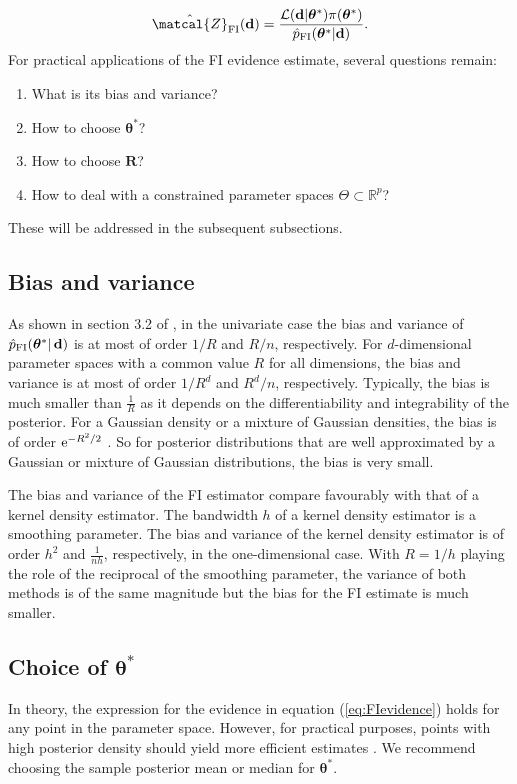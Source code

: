 \documentclass[%
 reprint,
 amsmath,amssymb,
 aps,
]{revtex4-2}
\def\R{\mathbb{R}}
\def\btheta{\boldsymbol{\theta}}
\def\btheta{\boldsymbol{\theta}}
\def\Rbold{\mathbf{R}}
\renewcommand{\d}{{\bf d}}
\newcommand{\btheta}{\mbox{\boldmath $\theta$}}
\newcommand{\e}{{\rm e}}
\begin{document}
\begin{equation}\label{eq:FIevidence}
 \hat{\matcal{Z}}_\text{FI}(\d) = \frac{\mathcal{L}(\d|\btheta^*)
 \pi(\btheta^*)}{\hat{p}_\text{FI}(\btheta^*|\d)}.
 \end{equation}
For practical applications of the FI evidence estimate, several questions remain:
\begin{enumerate}
     \item What is its bias and variance?
    \item How to choose $\btheta^*$?
    \item How to choose $\Rbold$?
    \item How to deal with a constrained parameter spaces $\Theta \subset \R^p$?
\end{enumerate}
These will be addressed in the subsequent subsections.


\subsection{\label{subsec:FI bias and variance} Bias and variance}
%
As shown in section 3.2 of \cite{rotiroti2022computing}, in the univariate case the bias and variance of $\hat{p}_\text{FI}(\btheta^*|\,\d)$ is at most of order $1/R$ and  $R/n$, respectively. For $d$-dimensional parameter spaces with a common value $R$ for all dimensions, the bias and variance is at most of order $1/R^d$ and  $R^d/n$, respectively. Typically, the bias is much smaller than $\frac{1}{R}$ as it depends on the differentiability and integrability of the posterior. For a Gaussian density or a mixture of Gaussian densities, the bias is of order $\e^{-R^2/2}$ \cite{rotiroti2022computing}. So for posterior distributions that are well approximated by a Gaussian or mixture of Gaussian distributions, the bias is very small.

The bias and variance of the FI estimator compare favourably with that of a kernel density estimator. The bandwidth $h$ of a kernel density estimator is a smoothing parameter. The bias and variance of the kernel density estimator is of order $h^2$ and $\frac{1}{nh}$, respectively, in the one-dimensional case.  With $R=1/h$ playing the role of the reciprocal of the smoothing parameter, the variance of both methods is of the same magnitude but the bias for the FI estimate is much smaller.

\subsection{\label{subsec:thetastar} Choice of $\btheta^*$}
In theory, the expression for the evidence in equation (\ref{eq:FIevidence}) holds for any point in the parameter space. However, for practical purposes, points with high posterior density should yield more efficient estimates \cite{chib1995marginal,chib2001marginal}. We recommend choosing the sample posterior mean or median for $\btheta^*$.
\end{document}
